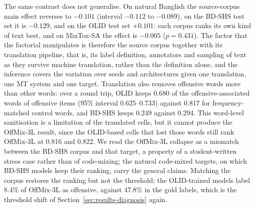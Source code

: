 The same contrast does not generalise. On natural Banglish the source-corpus main effect reverses to $-0.101$
(interval $-0.112$ to $-0.089$), on the BD-SHS test set it is $-0.129$, and on the OLID test set $+0.101$: each corpus
ranks its own kind of text best, and on MixTox-SA the effect is $-0.005$ ($p = 0.431$). The factor that the factorial
manipulates is therefore the source corpus together with its translation pipeline, that is, its label definition,
annotators and sampling of text as they survive machine translation, rather than the definition alone, and the inference covers the variation over seeds and architectures given one
translation, one MT system and one target. Translation also removes offensive words more than other words: over a
round trip, OLID keeps 0.680 of the offensive-associated words of offensive items (95\% interval 0.625--0.733) against
0.817 for frequency-matched control words, and BD-SHS keeps 0.249 against 0.294. This word-level sanitisation is a
limitation of the translated cells, but it cannot produce the OffMix-3L result, since the OLID-based cells that lost
those words still rank OffMix-3L at 0.816 and 0.822. We read the OffMix-3L collapse as a mismatch between the BD-SHS
corpus and that target, a property of a student-written stress case rather than of code-mixing; the natural
code-mixed targets, on which BD-SHS models keep their ranking, carry the general claims. Matching the corpus restores
the ranking but not the threshold: the OLID-trained models label 8.4\% of OffMix-3L as offensive, against 47.8\% in the
gold labels, which is the threshold shift of Section~\ref{sec:results-diagnosis} again.
